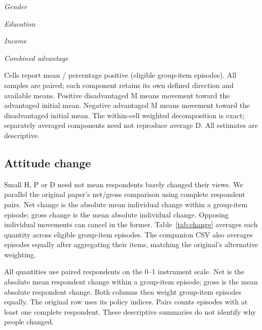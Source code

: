 \documentclass[11pt]{article}
\begin{document}
\begin{table}[p]
\centering\small
\caption{Parsing domination: whole-group and subgroup movement}
\label{tab:components}
\textit{Gender}\par\par\medskip
\textit{Education}\par\par\medskip
\textit{Income}\par\par\medskip
\textit{Combined advantage}\par
\begin{minipage}{\linewidth}\footnotesize
Cells report mean / percentage positive (eligible group-item episodes).
All samples are paired; each component retains its own defined direction and
available means. Positive disadvantaged M means movement toward the advantaged
initial mean. Negative advantaged M means movement toward the disadvantaged
initial mean. The within-cell weighted decomposition is exact; separately
averaged components need not reproduce average D. All estimates are descriptive.
\end{minipage}
\end{table}

\subsection{Attitude change}
Small H, P or D need not mean respondents barely changed their views. We parallel
the original paper's net/gross comparison using complete respondent pairs.
Net change is the absolute mean individual change within a group-item episode;
gross change is the mean absolute individual change. Opposing individual movements
can cancel in the former. Table~\ref{tab:change} averages each quantity across
eligible group-item episodes. The companion CSV also averages episodes equally
after aggregating their items, matching the original's alternative weighting.

\begin{table}[p]
\centering\small
\caption{Absolute net and gross attitude change on policy items}
\label{tab:change}

\begin{minipage}{\linewidth}\footnotesize
All quantities use paired respondents on the 0--1 instrument scale. Net is the
absolute mean respondent change within a group-item episode; gross is the mean
absolute respondent change. Both columns then weight group-item episodes equally.
The original row uses its policy indices. Pairs counts episodes with at least one
complete respondent. These descriptive summaries do not identify why people changed.
\end{minipage}
\end{table}
\end{document}
